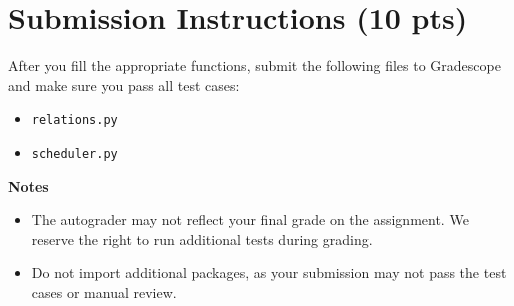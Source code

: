 \documentclass{article}
\begin{document}
\section*{Submission Instructions (10 pts)}
    After you fill the appropriate functions, submit the following files to Gradescope and make sure you pass all test cases:
    \begin{itemize}
        \item \lstinline{relations.py}
        \item \lstinline{scheduler.py}
    \end{itemize}

    \vspace{3mm}
    \textbf{Notes}

    \begin{itemize}
        \item The autograder may not reflect your final grade on the assignment. We reserve the right to run additional tests during grading.
        \item Do not import additional packages, as your submission may not pass the test cases or manual review.
    \end{itemize}
    
\end{document}
